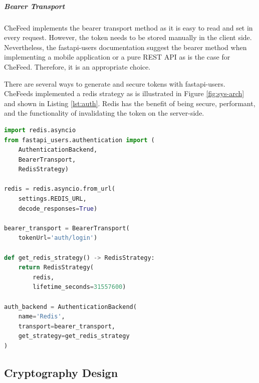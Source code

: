 \subparagraph{Bearer Transport} CheFeed implements the bearer transport method as it is easy to read and set in every request. However, the token needs to be stored manually in the client side. Nevertheless, the fastapi-users documentation suggest the bearer method when implementing a mobile application or a pure REST API as is the case for CheFeed. Therefore, it is an appropriate choice.

 There are several ways to generate and secure tokens with fastapi-users. CheFeeds implemented a redis strategy as is illustrated in Figure \ref{fig:sys-arch} and shown in Listing \ref{lst:auth}. Redis has the benefit of being secure, performant, and the functionality of invalidating the token on the server-side.


\begin{lstlisting}[language=Python, caption={auth\_backend.py}, label={lst:auth}, float]
import redis.asyncio
from fastapi_users.authentication import (
    AuthenticationBackend,
    BearerTransport,
    RedisStrategy)

redis = redis.asyncio.from_url(
    settings.REDIS_URL, 
    decode_responses=True)

bearer_transport = BearerTransport(
    tokenUrl='auth/login')

def get_redis_strategy() -> RedisStrategy:
    return RedisStrategy(
        redis, 
        lifetime_seconds=31557600)

auth_backend = AuthenticationBackend(
    name='Redis',
    transport=bearer_transport,
    get_strategy=get_redis_strategy
)
\end{lstlisting}

\subsection{Cryptography Design}


